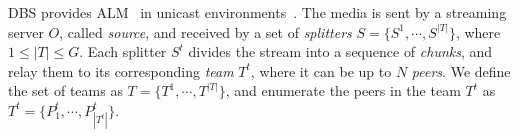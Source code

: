 DBS provides ALM~\cite{banerjee2002scalable} in unicast
environments~\cite{comer2003computer}. The media is sent by a
streaming server $O$, called \emph{source}, and received by a set
of \emph{splitters} $S=\{S^1,\cdots,S^{|T|}\}$, where $1\leq |T|\leq
G$. Each splitter $S^t$ divides the stream into a sequence
of \emph{chunks}, and relay them to its corresponding \emph{team}
$T^t$, where it can be up to $N$ \emph{peers}. We define the set of
teams as $T=\{T^1,\cdots,T^{|T|}\}$, and enumerate the peers in the
team $T^t$ as $T^t=\{P^t_1,\cdots,P^t_{|T^t|}\}$.
